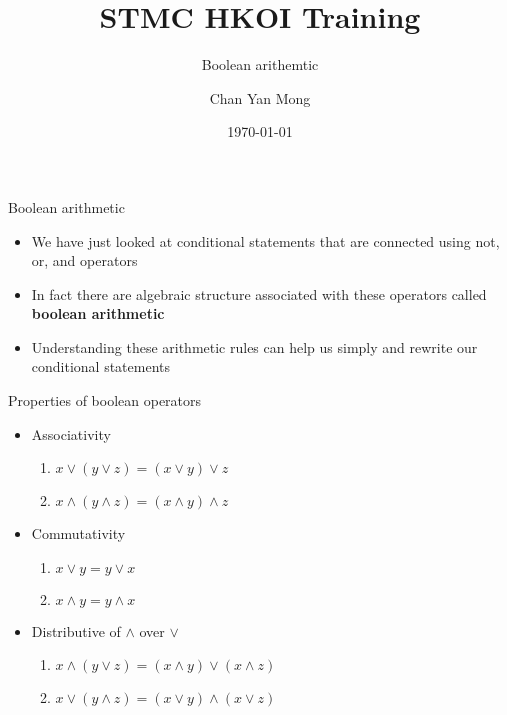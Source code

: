 \documentclass[10pt,xcolor={table,dvipsnames},t]{beamer}
\title[Your Short Title]{STMC HKOI Training}
\subtitle{Boolean arithemtic}
\author{Chan Yan Mong}
\date{\today}
\begin{document}
\begin{frame}
  \titlepage
\end{frame}


\begin{frame}{Boolean arithmetic}
  \begin{itemize}
    \item We have just looked at conditional statements that are connected using not, or, and operators
    \item In fact there are algebraic structure associated with these operators called \textbf{boolean arithmetic}
    \item Understanding these arithmetic rules can help us simply and rewrite our conditional statements
  \end{itemize}
\end{frame}

\begin{frame}{Properties of boolean operators}
  \begin{itemize}
    \item Associativity
    \begin{enumerate}
      \item $x\lor (y\lor z) = (x\lor y) \lor z$
      \item $x\land (y\land z) = (x\land y) \land z$
    \end{enumerate}
    \item Commutativity
    \begin{enumerate}
      \item $x\lor y = y \lor x$
      \item $x\land y  = y\land x$
    \end{enumerate}
    \item Distributive of $\land$ over $\lor$
    \begin{enumerate}
      \item $x \land (y\lor z) = (x \land y) \lor (x \land z)$\\
      \item $x \lor (y\land z) = (x\lor y) \land (x\lor z)$
    \end{enumerate}
  \end{itemize}
\end{frame}
\end{document}
